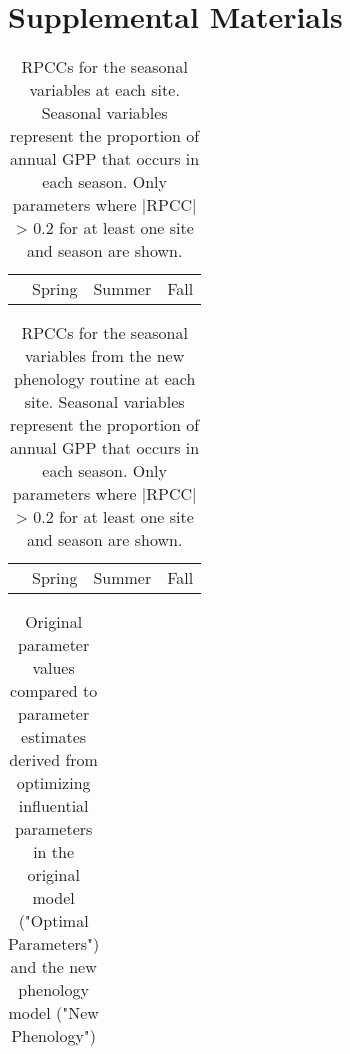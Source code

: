 \documentclass[]{article}
\newcommand{\beginsupplement}{%
	\setcounter{table}{0}
	\renewcommand{\thetable}{S\arabic{table}}%
	\setcounter{figure}{0}
	\renewcommand{\thefigure}{S\arabic{figure}}%
}
\begin{document}
\beginsupplement
\section{Supplemental Materials}
\begin{table}[ht]
	\begin{threeparttable}
		\caption{RPCCs for the seasonal variables at each site. Seasonal variables represent the proportion of annual GPP that occurs in each season. Only parameters where |RPCC| > 0.2 for at least one site and season are shown.} 
		\begin{tabular}{lrrrrrrrrrrrr}
			\toprule
			& \multicolumn{4}{c}{Spring} & \multicolumn{4}{c}{Summer} & \multicolumn{4}{c}{Fall} \\
			\cmidrule(lr){2-5} \cmidrule(lr){6-9} \cmidrule(lr){10-13}
			
		\end{tabular}
	\end{threeparttable}
\end{table}

\begin{table}[ht]
	\begin{threeparttable}
		\caption{RPCCs for the seasonal variables from the new phenology routine at each site. Seasonal variables represent the proportion of annual GPP that occurs in each season. Only parameters where |RPCC| > 0.2 for at least one site and season are shown.} 
		\begin{tabular}{lrrrrrrrrrrrr}
			\toprule
			& \multicolumn{4}{c}{Spring} & \multicolumn{4}{c}{Summer} & \multicolumn{4}{c}{Fall} \\
			\cmidrule(lr){2-5} \cmidrule(lr){6-9} \cmidrule(lr){10-13}
			
		\end{tabular}
	\end{threeparttable}
\end{table}

\begin{table}[ht]
	\begin{threeparttable} %
		\caption{Original parameter values compared to parameter estimates derived from optimizing influential parameters in the original model ("Optimal Parameters") and the new phenology model ("New Phenology")} 
		\begin{tabularx}{.5\textwidth}{p{1.6cm}*{3}{>{\centering\arraybackslash}X}}
			\toprule
			
		\end{tabularx}
	\end{threeparttable}
\end{table}
\end{document}
